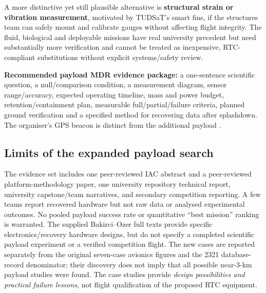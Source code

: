 \documentclass[10pt,a4paper]{article}
\begin{document}
A more distinctive yet still plausible alternative is \textbf{structural strain or vibration measurement}, motivated by TUDSaT's smart fins, if the structures team can safely mount and calibrate gauges without affecting flight integrity. The fluid, biological and deployable missions have real university precedent but need substantially more verification and cannot be treated as inexpensive, RTC-compliant substitutions without explicit systems/safety review.

\textbf{Recommended payload MDR evidence package:} a one-sentence scientific question, a null/comparison condition, a measurement diagram, sensor range/accuracy, expected operating timeline, mass and power budget, retention/containment plan, measurable full/partial/failure criteria, planned ground verification and a specified method for recovering data after splashdown. The organiser's GPS beacon is distinct from the additional payload \cite{rtc2027rules,rtc2027mdr}.

\subsection{Limits of the expanded payload search}
The evidence set includes one peer-reviewed IAC abstract and a peer-reviewed platform-methodology paper, one university repository technical report, university capstone/team narratives, and secondary competition reporting. A few teams report recovered hardware but not raw data or analysed experimental outcomes. No pooled payload success rate or quantitative ``best mission'' ranking is warranted. The supplied Bakirci--Ozer full texts provide specific electronics/recovery hardware designs, but do not specify a completed scientific payload experiment or a verified competition flight. The new cases are reported separately from the original seven-case avionics figures and the 2321 database-record denominator; their discovery does not imply that all possible near-3-km payload studies were found. The case studies provide \emph{design possibilities and practical failure lessons}, not flight qualification of the proposed RTC equipment.
\end{document}
